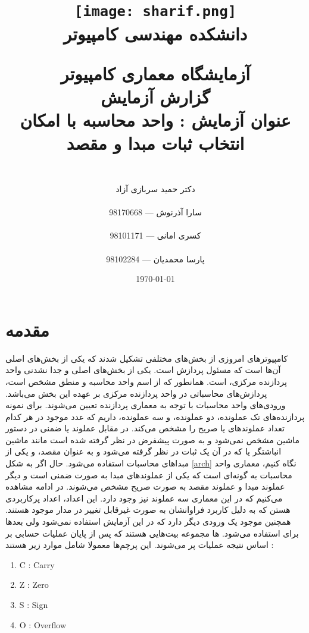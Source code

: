 \documentclass[fleqn]{article}
\title{
\texttt{[image: sharif.png]}\\
\normalsize{دانشکده مهندسی کامپیوتر}\\
\vspace{1cm}
    
\huge{آزمایشگاه معماری کامپیوتر}
\\ \vspace{.8cm}
\Large{گزارش آزمایش \expnumber}
\\ \vspace{.8cm}
\Large{عنوان آزمایش : واحد محاسبه با امکان انتخاب ثبات مبدا و مقصد}
}
\author{
\\
دکتر حمید سربازی آزاد
\\ \vspace{.4cm}
\\
  سارا آذرنوش       ---      98170668
\\ \vspace{0.2cm} \\
  کسری امانی       ---      98101171
\\ \vspace{0.2cm} \\
  پارسا محمدیان       ---      98102284
\\ \vspace{.4cm}
}
\date{\today}
\newcommand{\expnumber}{پنچم}
\begin{document}
\clearpage\maketitle
\thispagestyle{empty}

\newpage

\pagestyle{fancy}

\rhead{آزمایش \expnumber}

\tableofcontents

\setcounter{page}{1}

\newpage

\section{مقدمه}
کامپیوترهای امروزی از بخش‌های مختلفی تشکیل شدند که یکی از بخش‌های اصلی آن‌ها 
است که مسئول پردازش است. یکی از بخش‌های اصلی و جدا نشدنی واحد پردازنده مرکزی، 
است. همانطور که از اسم واحد محاسبه و منطق مشخص است، پردازش‌های محاسباتی در واحد پردازنده مرکزی 
بر عهده این بخش می‌باشد. ورودی‌های واحد محاسبات با توجه به معماری پردازنده تعیین می‌شوند. 
برای نمونه پردازنده‌های تک عملونده، دو عملونده، و سه عملونده، داریم که عدد موجود در هر کدام تعداد عملوندهای 
یا صریح را مشخص می‌کند. در مقابل عملوند 
یا ضمنی در دستور ماشین مشخص نمی‌شود و به صورت پیشفرض در نظر گرفته شده است مانند ماشین انباشتگر یا 
که در آن یک ثبات در نظر گرفته می‌شود و به عنوان مقصد، و یکی از مبداهای محاسبات استفاده می‌شود. 
حال اگر به شکل 
\ref{arch}
نگاه کنیم، معماری واحد محاسبات به گونه‌ای است که یکی از عملوندهای مبدا به صورت ضمنی 
است و دیگر عملوند مبدا و عملوند مقصد به صورت صریح مشخص می‌شوند. در ادامه مشاهده می‌کنیم 
که در این معماری سه عملوند 
نیز وجود دارد. این اعداد، اعداد پرکاربردی هستن که به دلیل کاربرد فراوانشان به صورت 
غیرقابل تغییر در مدار موجود هستند. همچنین 
موجود یک ورودی دیگر دارد که در این آزمایش استفاده نمی‌شود ولی بعدها برای 
استفاده می‌شود. 
ها 
مجموعه بیت‌هایی هستند که پس از پایان عملیات حسابی بر اساس نتیجه عملیات پر می‌شوند. 
این پرچم‌ها معمولا شامل موارد زیر هستند : 
\begin{enumerate}
  \item C : Carry
  \item Z : Zero
  \item S : Sign
  \item O : Overflow
\end{enumerate}
\end{document}

